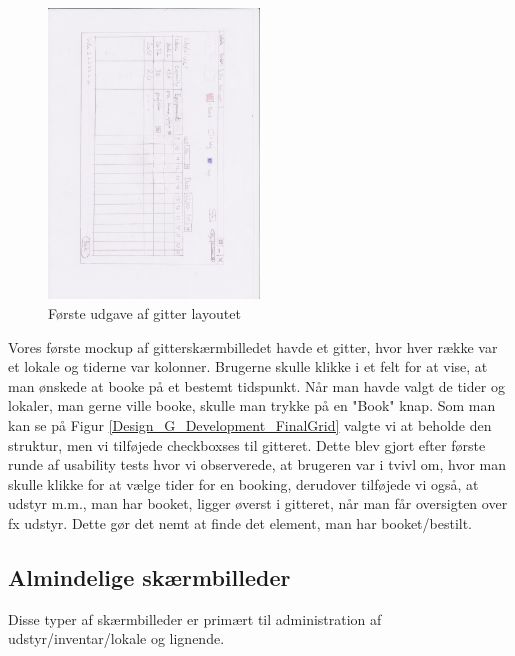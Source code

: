\begin{figure}[h!]
  \centering
    \includegraphics[width=0.5\textwidth, angle=90]{Appendix/GUI-Prototype/PaperMockup/LokaleListe_001}
  \caption{Første udgave af gitter layoutet}
\label{Design_G_Development_FirstGrid}
\end{figure}

Vores første mockup af gitterskærmbilledet havde et gitter, hvor hver række var et lokale og tiderne var kolonner. Brugerne skulle klikke i et felt for at vise, at man ønskede at booke på et bestemt tidspunkt. Når man havde valgt de tider og lokaler, man gerne ville booke, skulle man trykke på en "Book" knap. 
Som man kan se på Figur \ref{Design_G_Development_FinalGrid} valgte vi at beholde den struktur, men vi tilføjede checkboxses til gitteret. Dette blev gjort efter første runde af usability tests hvor vi observerede, at brugeren var i tvivl om, hvor man skulle klikke for at vælge tider for en booking, derudover tilføjede vi også, at udstyr m.m., man har booket, ligger øverst i gitteret, når man får oversigten over fx udstyr. Dette gør det nemt at finde det element, man har booket/bestilt.


\subsection{Almindelige skærmbilleder}
\label{Design_G_Development_NormalWindows}
Disse typer af skærmbilleder er primært til administration af udstyr/inventar/lokale og lignende.

